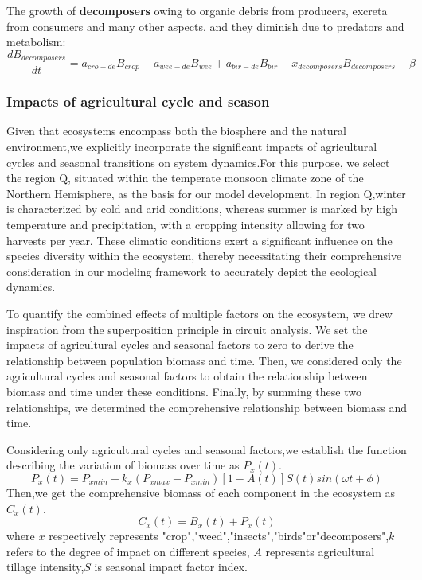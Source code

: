 \documentclass[12pt]{article}
\begin{document}
	The growth of \textbf{decomposers} owing to organic debris from producers, excreta from consumers and many other aspects, and they diminish due to predators and metabolism:
	\begin{equation}
		\frac{dB_{decomposers}}{dt}=a_{cro-de}B_{crop}+a_{wee-de}B_{wee}+a_{bir-de}B_{bir}-x_{decomposers}B_{decomposers}-\beta
	\end{equation}
	
	\subsubsection{Impacts of agricultural cycle and season}
	\hspace{2em}Given that ecosystems encompass both the biosphere and the natural environment,we explicitly incorporate the significant impacts of agricultural cycles and seasonal transitions on system dynamics.For this purpose, we select the region Q, situated within the temperate monsoon climate zone of the Northern Hemisphere, as the basis for our model development. In region Q,winter is characterized by cold and arid conditions, whereas summer is marked by high temperature and precipitation, with a cropping intensity allowing for two harvests per year. These climatic conditions exert a significant influence on the species diversity within the ecosystem, thereby necessitating their comprehensive consideration in our modeling framework to accurately depict the ecological dynamics.
	
	To quantify the combined effects of multiple factors on the ecosystem, we drew inspiration from the superposition principle in circuit analysis. We set the impacts of agricultural cycles and seasonal factors to zero to derive the relationship between population biomass and time. Then, we considered only the agricultural cycles and seasonal factors to obtain the relationship between biomass and time under these conditions. Finally, by summing these two relationships, we determined the comprehensive relationship between biomass and time.
	
	Considering only agricultural cycles and seasonal factors,we establish the function describing the variation of biomass over time as $P_x(t)$.
	\begin{equation}
		P_{x}(t)=P_{xmin}+k_{x}(P_{xmax}-P_{xmin})[1-A(t)]S(t)sin(\omega t+\phi)
	\end{equation}
	Then,we get the comprehensive biomass of each component in the ecosystem as $C_{x}(t)$.
	\begin{equation}
		C_{x}(t)=B_{x}(t)+P_{x}(t)
	\end{equation}
	where $x$ respectively represents "crop","weed","insects","birds"or"decomposers",$k$ refers to the degree of impact on different species, $A$ represents agricultural tillage intensity,$S$ is seasonal impact factor index.
	
\end{document}
